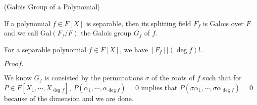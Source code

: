 \documentclass{article}
\newcommand{\Pf}[1]{$Proof.$\par}
\begin{document}
\begin{definition}
    (Galois Group of a Polynomial)\par
    If a polynomial $f\in F[X]$ is separable, then its splitting field $F_f$ is Galois over $F$ and we call $\text{Gal}(F_f/F)$ the Galois group $G_f$ of $f$. 
\end{definition}

\begin{proposition}
    For a separable polynomial $f\in F[X]$, we have $[F_f]|(\deg f)!$.
\end{proposition}
\Pf\par
    We know $G_f$ is consisted by the permutations $\sigma$ of the roots of $f$ such that for $P\in F[X_1,\cdots,X_{\deg f}]$, $P(\alpha_1,\cdots,\alpha_{\deg f}) = 0$ implies that $P(\sigma\alpha_1,\cdots,\sigma\alpha_{\deg f}) = 0$ because of the dimension and we are done.

\newpage




\end{document}
